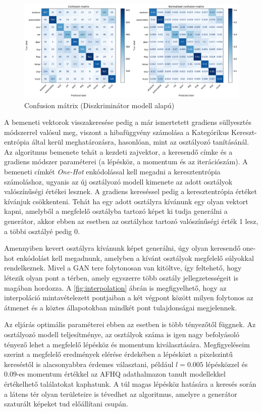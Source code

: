 \begin{figure}[h]
	\centering
	\includegraphics[width=15cm]{images/transfer_discriminator_confusion.png}
	\caption{Confusion mátrix (Diszkriminátor modell alapú)}
	\label{fig:transfer_confusion_disc}
\end{figure}


A bemeneti vektorok visszakeresése pedig a már ismertetett gradiens süllyesztés módszerrel valósul meg, viszont a hibafüggvény számolása a Kategórikus Kereszt-entrópia által kerül meghatározásra, hasonlóan, mint az osztályozó tanításánál. Az algoritmus bemenete tehát a kezdeti zajvektor, a keresendő címke és a gradiens módszer paraméterei (a lépésköz, a momentum és az iterációszám).
A bemeneti címkét \textit{One-Hot} enkódolással kell megadni a keresztentrópia számoláshoz, ugyanis az új osztályozó modell kimenete az adott osztályok valószínűségi értékei lesznek. A gradiens kereséssel pedig a keresztentrópia értéket kívánjuk csökkenteni. Tehát ha egy adott osztályra kívánunk egy olyan vektort kapni, amelyből a megfelelő osztályba tartozó képet ki tudja generálni a generátor, akkor ebben az esetben az osztályhoz tartozó valószínűségi érték 1 lesz, a többi osztályé pedig 0.

Amennyiben kevert osztályra kívánunk képet generálni, úgy olyan keresendő one-hot enkódolást kell megadnunk, amelyben a kívánt osztályok megfelelő súlyokkal rendelkeznek. Mivel a GAN tere folytonosan van kitöltve, így feltehető, hogy létezik olyan pont a térben, amely egyszerre több osztály jellegzetességeit is magában hordozza. A \ref{fig:interpolation} ábrán is megfigyelhető, hogy az interpoláció mintavételezett pontjaiban a két végpont között milyen folytonos az átmenet és a köztes állapotokban mindkét pont tulajdonságai megjelennek.

Az eljárás optimális paraméterei ebben az esetben is több tényezőtől függnek. Az osztályozó modell teljesítménye, az osztályok száma is igen nagy befolyásoló tényező lehet a megfelelő lépésköz és momentum kiválasztására.  Megfigyeléseim szerint a megfelelő eredmények elérése érdekében a lépésközt a pixelszintű kereséstől is alacsonyabbra érdemes választani, például $l=0.005$ lépésközzel és $0.09$-es momentum értékkel az AFHQ adathalmazon tanult modellekkel értékelhető találatokat kaphatunk. A túl magas lépésköz hatására a keresés során a látens tér olyan területeire is tévedhet az algoritmus, amelyre a generátor szaturált képeket tud előállítani csupán.

